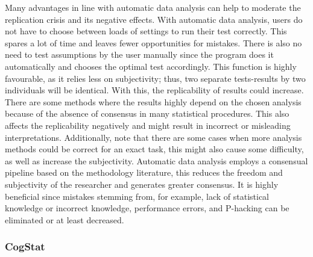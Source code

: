 \documentclass[
]{book}
\begin{document}
Many advantages in line with automatic data analysis can help to moderate the replication crisis and its negative effects. With automatic data analysis, users do not have to choose between loads of settings to run their test correctly. This spares a lot of time and leaves fewer opportunities for mistakes. There is also no need to test assumptions by the user manually since the program does it automatically and chooses the optimal test accordingly. This function is highly favourable, as it relies less on subjectivity; thus, two separate tests-results by two individuals will be identical. With this, the replicability of results could increase. There are some methods where the results highly depend on the chosen analysis because of the absence of consensus in many statistical procedures. This also affects the replicability negatively and might result in incorrect or misleading interpretations. Additionally, note that there are some cases when more analysis methods could be correct for an exact task, this might also cause some difficulty, as well as increase the subjectivity. Automatic data analysis employs a consensual pipeline based on the methodology literature, this reduces the freedom and subjectivity of the researcher and generates greater consensus. It is highly beneficial since mistakes stemming from, for example, lack of statistical knowledge or incorrect knowledge, performance errors, and P-hacking can be eliminated or at least decreased.

\hypertarget{cogstat-1}{%
\subsubsection{CogStat}\label{cogstat-1}}
\end{document}
